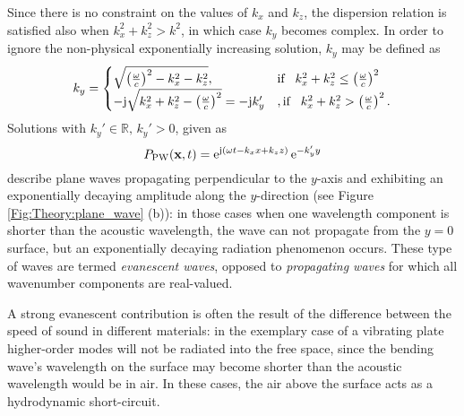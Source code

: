 Since there is no constraint on the values of $k_x$ and $k_z$, the dispersion relation is satisfied also when $k_x^2 + k_z^2 > k^2$, in which case $k_y$ becomes complex.
In order to ignore the non-physical exponentially increasing solution, $k_y$ may be defined as 
\begin{equation}
k_y = \begin{cases}
\sqrt{\left(\frac{\omega}{c}\right)^2 - k_x^2 - k_z^2},  & \text{if} \hspace{3mm} k_x^2 + k_z^2 \leq \left(\frac{\omega}{c}\right)^2\\
-\mathrm{j} \sqrt{k_x^2+k_z^2 - \left(\frac{\omega}{c}\right)^2 } = -\mathrm{j} k_y' &,  \text{if} \hspace{3mm} k_x^2 + k_z^2 > \left(\frac{\omega}{c}\right)^2.
                 \end{cases}
\label{eq:theory:k_y_definition}
\end{equation}
Solutions with $k_y' \in \mathbb{R}, \, k_y'>0$, given as
 \begin{equation}
 P_{\mathrm{PW}}(\mathbf{x},t) = \mathrm{e}^{\mathrm{j} \left( \omega t - k_x x + k_z z \right) } \, \mathrm{e}^{-k_y' y}
 \end{equation}
describe plane waves propagating perpendicular to the $y$-axis and exhibiting an exponentially decaying amplitude along the $y$-direction (see Figure \ref{Fig:Theory:plane_wave} (b)):
in those cases when one wavelength component is shorter than the acoustic wavelength, the wave can not propagate from the $y = 0$ surface, but an exponentially decaying radiation phenomenon occurs.
These type of waves are termed \emph{evanescent waves}, opposed to \emph{propagating waves} for which all wavenumber components are real-valued.
 
%
A strong evanescent contribution is often the result of the difference between the speed of sound in different materials: %
in the exemplary case of a vibrating plate higher-order modes will not be radiated into the free space, since the bending wave's wavelength on the surface may become shorter than the acoustic wavelength would be in air. 
In these cases, the air above the surface acts as a hydrodynamic short-circuit.

